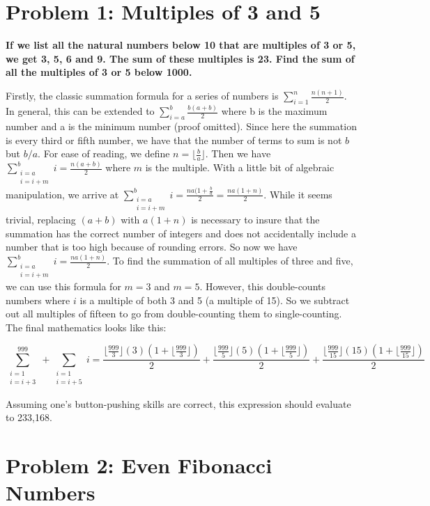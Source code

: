\documentclass{article}
\begin{document}
\section{Problem 1: Multiples of 3 and 5}

\textbf{If we list all the natural numbers below 10 that are multiples of 3 or 5, we get 3, 
5, 6 and 9. The sum of these multiples is 23. Find the sum of all the multiples of 3 or 5 
below 1000.}

Firstly, the classic summation formula for a series of numbers is 
$\sum\limits_{i=1}^{n}\frac{n(n+1)}{2}$. In general, this can be extended to 
$\sum\limits_{i=a}^{b}\frac{b(a+b)}{2}$ where b is the maximum number and a is the minimum 
number (proof omitted). Since here the summation is every third or fifth number, we have that 
the number of terms to sum is not $b$ but $b/a$. For ease of reading, we define 
$n = \lfloor\frac{b}{a}\rfloor$. Then we have 
$\sum\limits_{\substack{i=a \\ i=i+m}}^{b}i=\frac{n(a+b)}{2}$ where $m$ is the multiple. With 
a little bit of algebraic manipulation, we arrive at
$\sum\limits_{\substack{i=a \\ i=i+m}}^{b}i=\frac{na(1+\frac{b}{a}}{2}=\frac{na(1+n)}{2}$.
While it seems trivial, replacing $(a + b)$ with $a(1 + n)$ is necessary to insure that the 
summation has the correct number of integers and does not accidentally include a number that 
is too high because of rounding errors. So now we have
$\sum\limits_{\substack{i=a \\ i=i+m}}^{b}i=\frac{na(1+n)}{2}$. To find the summation of all 
multiples of three and five, we can use this formula for $m = 3$ and $m = 5$. However, this 
double-counts numbers where $i$ is a multiple of both 3 and 5 (a multiple of 15). So we 
subtract out all multiples of fifteen to go from double-counting them to single-counting. The
final mathematics looks like this:

\[
\sum\limits_{\substack{i=1 \\ i=i+3}}^{999} + \sum\limits_{\substack{i=1 \\ i=i+5}} i = 
\frac{\lfloor\frac{999}{3}\rfloor(3)(1+\lfloor\frac{999}{3}\rfloor)}{2} + 
\frac{\lfloor\frac{999}{5}\rfloor(5)(1+\lfloor\frac{999}{5}\rfloor)}{2} + 
\frac{\lfloor\frac{999}{15}\rfloor(15)(1+\lfloor\frac{999}{15}\rfloor)}{2}
\]

Assuming one’s button-pushing skills are correct, this expression should evaluate to 233,168.

\section{Problem 2: Even Fibonacci Numbers}
\end{document}

